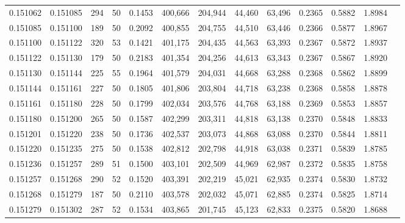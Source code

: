 \begin{tabular}{rrrrrrrrrrrrr}
0.151062 & 0.151085 &   294 &  50 &                                     0.1453 & 400,666 & 204,944 &  44,460 &  63,496 & 0.2365 & 0.5882 & 1.8984 \\
0.151085 & 0.151100 &   189 &  50 &                                     0.2092 & 400,855 & 204,755 &  44,510 &  63,446 & 0.2366 & 0.5877 & 1.8967 \\
0.151100 & 0.151122 &   320 &  53 &                                     0.1421 & 401,175 & 204,435 &  44,563 &  63,393 & 0.2367 & 0.5872 & 1.8937 \\
0.151122 & 0.151130 &   179 &  50 &                                     0.2183 & 401,354 & 204,256 &  44,613 &  63,343 & 0.2367 & 0.5867 & 1.8920 \\
0.151130 & 0.151144 &   225 &  55 &                                     0.1964 & 401,579 & 204,031 &  44,668 &  63,288 & 0.2368 & 0.5862 & 1.8899 \\
0.151144 & 0.151161 &   227 &  50 &                                     0.1805 & 401,806 & 203,804 &  44,718 &  63,238 & 0.2368 & 0.5858 & 1.8878 \\
0.151161 & 0.151180 &   228 &  50 &                                     0.1799 & 402,034 & 203,576 &  44,768 &  63,188 & 0.2369 & 0.5853 & 1.8857 \\
0.151180 & 0.151200 &   265 &  50 &                                     0.1587 & 402,299 & 203,311 &  44,818 &  63,138 & 0.2370 & 0.5848 & 1.8833 \\
0.151201 & 0.151220 &   238 &  50 &                                     0.1736 & 402,537 & 203,073 &  44,868 &  63,088 & 0.2370 & 0.5844 & 1.8811 \\
0.151220 & 0.151235 &   275 &  50 &                                     0.1538 & 402,812 & 202,798 &  44,918 &  63,038 & 0.2371 & 0.5839 & 1.8785 \\
0.151236 & 0.151257 &   289 &  51 &                                     0.1500 & 403,101 & 202,509 &  44,969 &  62,987 & 0.2372 & 0.5835 & 1.8758 \\
0.151257 & 0.151268 &   290 &  52 &                                     0.1520 & 403,391 & 202,219 &  45,021 &  62,935 & 0.2374 & 0.5830 & 1.8732 \\
0.151268 & 0.151279 &   187 &  50 &                                     0.2110 & 403,578 & 202,032 &  45,071 &  62,885 & 0.2374 & 0.5825 & 1.8714 \\
0.151279 & 0.151302 &   287 &  52 &                                     0.1534 & 403,865 & 201,745 &  45,123 &  62,833 & 0.2375 & 0.5820 & 1.8688 \\

\end{tabular}
